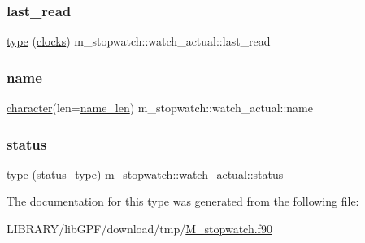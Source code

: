 \mbox{\label{structm__stopwatch_1_1watch__actual_ae1d38c1b64f646e6342283c24ad3eaad}} 
\subsubsection{\texorpdfstring{last\+\_\+read}{last\_read}}
{\footnotesize\ttfamily \hyperlink{stop__watch_83_8txt_a70f0ead91c32e25323c03265aa302c1c}{type} (\hyperlink{structm__stopwatch_1_1clocks}{clocks}) m\+\_\+stopwatch\+::watch\+\_\+actual\+::last\+\_\+read\hspace{0.3cm}{\ttfamily [private]}}

\mbox{\label{structm__stopwatch_1_1watch__actual_a991c67cbbf530fe7690d0e20d82acd83}} 
\subsubsection{\texorpdfstring{name}{name}}
{\footnotesize\ttfamily \hyperlink{option__stopwatch_83_8txt_abd4b21fbbd175834027b5224bfe97e66}{character}(len=\hyperlink{namespacem__stopwatch_a90c3eba08ec94bd1499d3afcd621d045}{name\+\_\+len}) m\+\_\+stopwatch\+::watch\+\_\+actual\+::name\hspace{0.3cm}{\ttfamily [private]}}

\mbox{\label{structm__stopwatch_1_1watch__actual_aa5946ce38edc266e09dfc0a12a33710c}} 
\subsubsection{\texorpdfstring{status}{status}}
{\footnotesize\ttfamily \hyperlink{stop__watch_83_8txt_a70f0ead91c32e25323c03265aa302c1c}{type} (\hyperlink{structm__stopwatch_1_1status__type}{status\+\_\+type}) m\+\_\+stopwatch\+::watch\+\_\+actual\+::status\hspace{0.3cm}{\ttfamily [private]}}



The documentation for this type was generated from the following file\+:\begin{DoxyCompactItemize}
\item 
L\+I\+B\+R\+A\+R\+Y/lib\+G\+P\+F/download/tmp/\hyperlink{M__stopwatch_8f90}{M\+\_\+stopwatch.\+f90}\end{DoxyCompactItemize}
